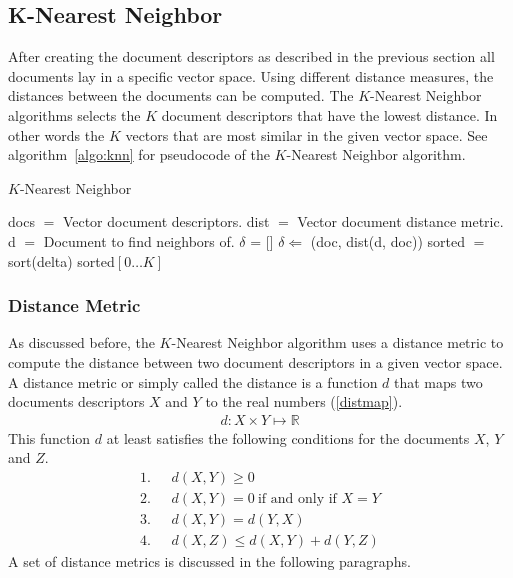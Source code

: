 \subsection{K-Nearest Neighbor}
After creating the document descriptors as described in the previous section
all documents lay in a specific vector space. Using different distance measures,
the distances between the documents can be computed. The $K$-Nearest
Neighbor algorithms selects the $K$ document descriptors that have the lowest
distance. In other words the $K$ vectors that are most similar in the given
vector space. See algorithm~\ref{algo:knn} for pseudocode of the $K$-Nearest
Neighbor algorithm.

\begin{algorithm}                      
  \caption{$K$-Nearest Neighbor}      
  \label{algo:knn}
  \begin{algorithmic}

    \STATE docs $=$ Vector document descriptors.
    \STATE dist $=$ Vector document distance metric.
    \STATE d $=$ Document to find neighbors of.
    \STATE $\delta$ = []
      \STATE $\delta \Leftarrow$ (doc, dist(d, doc))
    \ENDFOR
    \STATE sorted $=$ sort(delta)
    \RETURN sorted$[0\ldots K]$
  \end{algorithmic}
\end{algorithm}

\subsubsection{Distance Metric}
\label{sec:metrics}
As discussed before, the $K$-Nearest Neighbor algorithm uses a distance metric
to compute the distance between two document descriptors in a given vector
space. A distance metric or simply called the distance is a function $d$ that 
maps two documents descriptors $X$ and $Y$ to the real numbers (\ref{distmap}).
\begin{align}
  d : X \times Y \mapsto \mathbb{R} \label{distmap}
\end{align}
This function $d$ at least satisfies the following conditions for the documents
$X$, $Y$ and $Z$.
\begin{align*}
  1.\ \ \ & d(X,Y) \geq 0 \\
  2.\ \ \ & d(X,Y) = 0\  \text{if and only if $X=Y$} \\
  3.\ \ \ & d(X,Y) = d(Y,X) \\
  4.\ \ \ & d(X,Z) \leq d(X,Y) + d(Y,Z)
\end{align*}
A set of distance metrics is discussed in the following paragraphs. 

